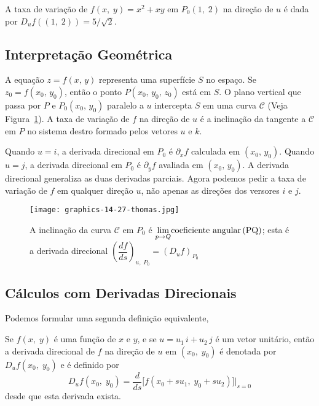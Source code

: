 A taxa de variação de \(f(x,\; y) = x^{2} + xy\) em \(P_{0}(1,\; 2)\) na direção de \(u\) é dada por \(D_{u}f((1,\;
2))= 5/\sqrt{2}\).



%
\subsection{Interpretação Geométrica}
%
A equação $z = f(x,\, y)$ representa uma superfície $S$ no espaço. Se $z_{0} = f(x_{0},\, y_{0})$, então o ponto $P(x_{0},\, y_{0},\, z_{0})$ está em
$S$. O plano vertical que passa por $P$ e $P_{0}(x_{0},\, y_{0})$ paralelo a $u$ intercepta $S$ em uma curva $\mathcal{C}$ (Veja
Figura~\ref{fig:14-27-thomas}). A taxa de variação de $f$ na direção de $u$ é a inclinação da tangente a $\mathcal{C}$ em $P$ no sistema destro
formado pelos vetores $u$ e $k$.

Quando $u=i$, a derivada direcional em $P_{0}$ é $\partial_{x}f$ calculada em $(x_{0},\, y_{0})$. Quando $u=j$, a derivada direcional em $P_{0}$ é
$\partial_{y}f$ avaliada em $(x_{0},\, y_{0})$. A derivada direcional generaliza as duas derivadas parciais. Agora podemos pedir a taxa de variação de
$f$ em qualquer direção $u$, não apenas as direções dos versores $i$ e $j$.

\begin{figure}[!h]
	\centering
	\texttt{[image: graphics-14-27-thomas.jpg]}
	\caption{A inclinação da curva \(\mathcal{C}\) em \(P_{0}\) é \(\displaystyle{\lim_{p\to Q}}\text{coeficiente angular\,(PQ)}\); esta é a derivada direcional
		\(\left(\dfrac{df}{ds} \right)_{u,\; P_{0}} = (D_{u}f)_{P_{0}}\)}
	\label{fig:14-27-thomas}
\end{figure}

%
\subsection{Cálculos com Derivadas Direcionais}
%

Podemos formular uma segunda definição equivalente,
\begin{defi}
	Se \(f (x,\; y)\) é uma função de \(x\) e \(y\), e se \(u = u_{1}\,i + u_{2}\, j\) é um vetor unitário, então a derivada direcional de \(f\) na direção de \(u\) em \((x_{0},\; y_{0})\) é denotada por \(D_{u}f (x_{0}, \; y_{0})\) e é definido por
	\begin{equation}\label{eq:2-def}
		D_{u}f(x_{0}, \; y_{0}) =\frac{d}{ds}\bigl[f(x_{0} + su_{1},\;  y_{0} + su_{2})  \bigr]\bigg\vert_{s=0}
	\end{equation}
	desde que esta derivada exista.
\end{defi}


